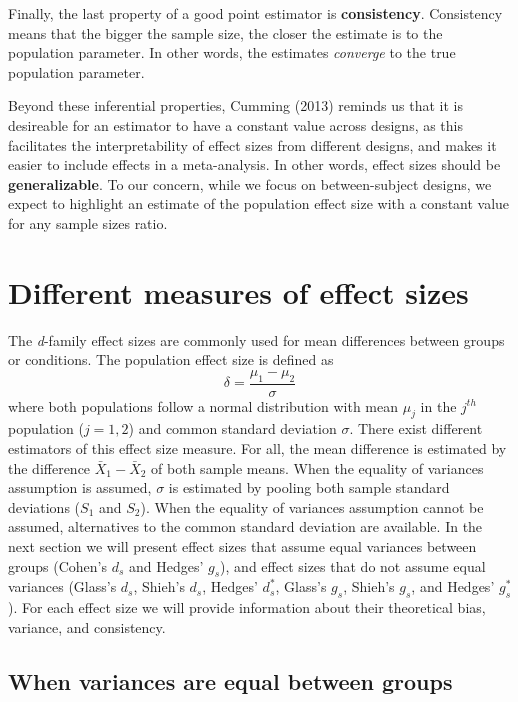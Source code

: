 \documentclass[
  english,
  man,floatsintext]{apa6}
\begin{document}
Finally, the last property of a good point estimator is \textbf{consistency}. Consistency means that the bigger the sample size, the closer the estimate is to the population parameter. In other words, the estimates \emph{converge} to the true population parameter.

Beyond these inferential properties, Cumming (2013) reminds us that it is desireable for an estimator to have a constant value across designs, as this facilitates the interpretability of effect sizes from different designs, and makes it easier to include effects in a meta-analysis. In other words, effect sizes should be \textbf{generalizable}. To our concern, while we focus on between-subject designs, we expect to highlight an estimate of the population effect size with a constant value for any sample sizes ratio.

\hypertarget{different-measures-of-effect-sizes}{%
\section{Different measures of effect sizes}\label{different-measures-of-effect-sizes}}

The \emph{d}-family effect sizes are commonly used for mean differences between groups or conditions. The population effect size is defined as
\begin{equation*} 
\delta = \frac{\mu_{1}-\mu_{2}}{\sigma} 
\label{eq:Cohendelta}
\end{equation*}
where both populations follow a normal distribution with mean \(\mu_j\) in the \(j^{th}\) population (\(j=1,2\)) and common standard deviation \(\sigma\). There exist different estimators of this effect size measure. For all, the mean difference is estimated by the difference \(\bar{X}_1-\bar{X}_2\) of both sample means. When the equality of variances assumption is assumed, \(\sigma\) is estimated by pooling both sample standard deviations (\(S_1\) and \(S_2\)). When the equality of variances assumption cannot be assumed, alternatives to the common standard deviation are available. In the next section we will present effect sizes that assume equal variances between groups (Cohen's \(d_s\) and Hedges' \(g_s\)), and effect sizes that do not assume equal variances (Glass's \(d_s\), Shieh's \(d_s\), Hedges' \(d^*_s\), Glass's \(g_s\), Shieh's \(g_s\), and Hedges' \(g^*_s\)). For each effect size we will provide information about their theoretical bias, variance, and consistency.

\hypertarget{when-variances-are-equal-between-groups}{%
\subsection{When variances are equal between groups}\label{when-variances-are-equal-between-groups}}
\end{document}
